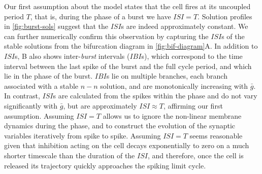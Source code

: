 Our first assumption about the model states that the \free{} cell fires at its uncoupled period $T$, that is, during the \free{} phase of a burst we have $ISI=T$.
Solution profiles in \cref{fig:burst-sols} suggest that the $ISI$s are indeed approximately constant.
We can further numerically confirm this observation by capturing the $ISI$s of the stable solutions from the bifurcation diagram in \cref{fig:bif-diagram}A.
In addition to $ISI$s, B also shows inter-\textit{burst} intervals ($IBI$s), which correspond to the time interval between the last spike of the burst and the full cycle period, and which lie in the \suppressed{} phase of the burst.
$IBI$s lie on multiple branches, each branch associated with a stable $n-n$ solution, and are monotonically increasing with $\bar g$.
In contrast, $ISI$s are calculated from the spikes within the \free{} phase and do not vary significantly with $\bar g$, but are approximately $ISI\approx T$, affirming our first assumption.
Assuming $ISI=T$ allows us to ignore the non-linear membrane dynamics during the \free{} phase, and to construct the evolution of the synaptic variables iteratively from spike to spike.
Assuming $ISI=T$ seems reasonable given that inhibition acting on the \suppressed{} cell decays exponentially to zero on a much shorter timescale than the duration of the $ISI$, and therefore, once the \suppressed{} cell is released its trajectory quickly approaches the spiking limit cycle.

